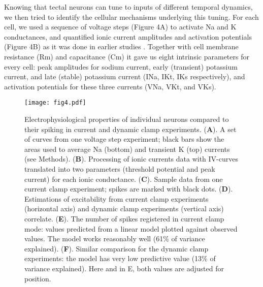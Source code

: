 \documentclass{article}
\begin{document}
Knowing that tectal neurons can tune to inputs of different temporal dynamics, we then tried to identify the cellular mechanisms underlying this tuning. For each cell, we used a sequence of voltage steps (Figure 4A) to activate Na and K conductances, and quantified ionic current amplitudes and activation potentials (Figure 4B) as it was done in earlier studies \citep{ciarleglio2015}. Together with cell membrane resistance (Rm) and capacitance (Cm) it gave us eight intrinsic parameters for every cell: peak amplitudes for sodium current, early (transient) potassium current, and late (stable) potassium current (INa, IKt, IKs respectively), and activation potentials for these three currents (VNa, VKt, and VKs). 

\begin{figure}[!t]
\centering
\texttt{[image: fig4.pdf]}
\caption{Electrophysiological properties of individual neurons compared to their spiking in current and dynamic clamp experiments. (\textbf{A}). A set of curves from one voltage step experiment; black bars show the areas used to average Na (bottom) and transient K (top) currents (see Methods). (\textbf{B}). Processing of ionic currents data with IV-curves translated into two parameters (threshold potential and peak current) for each ionic conductance. (\textbf{C}). Sample data from one current clamp experiment; spikes are marked with black dots. (\textbf{D}). Estimations of excitability from current clamp experiments (horizontal axis) and dynamic clamp experiments (vertical axis) correlate. (\textbf{E}). The number of spikes registered in current clamp mode: values predicted from a linear model plotted against observed values. The model works reasonably well (61\% of variance explained). (\textbf{F}). Similar comparison for the dynamic clamp experiments: the model has very low predictive value (13\% of variance explained). Here and in E, both values are adjusted for position.}
\end{figure}
\end{document}
